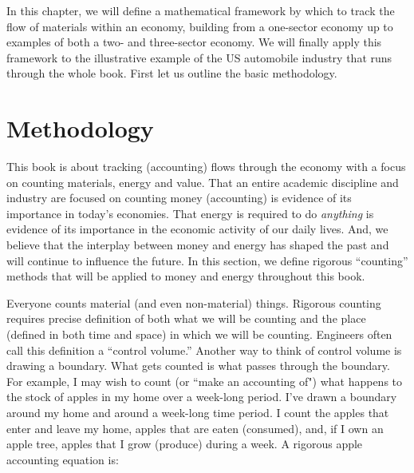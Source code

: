In this chapter, we will define a mathematical framework by which to track the flow of
materials within an economy, building from a one-sector economy up to examples of both a
two- and three-sector economy. We will finally apply this framework to the illustrative
example of the US automobile industry that runs through the whole book. First let us
outline the basic methodology.

\section{Methodology}
\label{sec:Materials_Methodology}




This book is about tracking (accounting) flows through the 
economy with a focus on counting materials, energy and value.
That an entire academic discipline and industry are focused on counting money (accounting)
is evidence of its importance in today's economies.
That energy is required to do \emph{anything} is evidence 
of its importance in the economic activity of our daily lives.
And, we believe that the interplay between money and energy
has shaped the past and will continue to influence the future.
In this section, we define rigorous ``counting'' methods that will be applied
to money and energy throughout this book.

Everyone counts material (and even non-material) things. 
Rigorous counting requires precise definition of both 
what we will be counting
and the place (defined in both time and space) in which we will be counting. 
Engineers often call this definition a ``control volume.'' Another way to think of
control volume is drawing a boundary. What gets counted is 
what passes through the boundary.
For example, I may wish to count (or ``make an accounting of") 
what happens to the stock  of apples in my home over a week-long period. 
I've drawn a boundary around my home and around a week-long time period.
I  count the apples that enter and leave my home, 
apples that are eaten (consumed),
and, if I own an apple tree, apples that I grow (produce) during a week. 
A rigorous apple accounting equation is:

